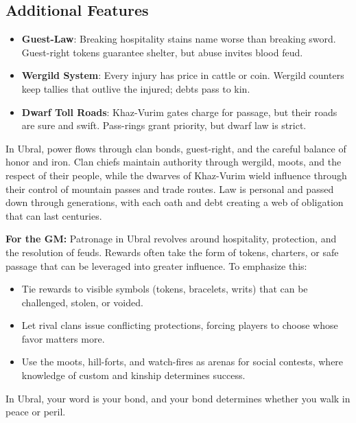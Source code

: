\subsection*{Additional Features}
\begin{itemize}
\item \textbf{Guest-Law}: Breaking hospitality stains name worse than breaking sword. Guest-right tokens guarantee shelter, but abuse invites blood feud.
\item \textbf{Wergild System}: Every injury has price in cattle or coin. Wergild counters keep tallies that outlive the injured; debts pass to kin.
\item \textbf{Dwarf Toll Roads}: Khaz-Vurim gates charge for passage, but their roads are sure and swift. Pass-rings grant priority, but dwarf law is strict.
\end{itemize}

\begin{tcolorbox}[colback=black!3,colframe=black!40!white,title={Patronage \& Power}]
In Ubral, power flows through clan bonds, guest-right, and the careful balance of honor and iron. Clan chiefs maintain authority through wergild, moots, and the respect of their people, while the dwarves of Khaz-Vurim wield influence through their control of mountain passes and trade routes. Law is personal and passed down through generations, with each oath and debt creating a web of obligation that can last centuries.

\textbf{For the GM:}  
Patronage in Ubral revolves around hospitality, protection, and the resolution of feuds. Rewards often take the form of tokens, charters, or safe passage that can be leveraged into greater influence. To emphasize this:
\begin{itemize}
\item Tie rewards to visible symbols (tokens, bracelets, writs) that can be challenged, stolen, or voided.
\item Let rival clans issue conflicting protections, forcing players to choose whose favor matters more.
\item Use the moots, hill-forts, and watch-fires as arenas for social contests, where knowledge of custom and kinship determines success.
\end{itemize}
In Ubral, your word is your bond, and your bond determines whether you walk in peace or peril.
\end{tcolorbox}


